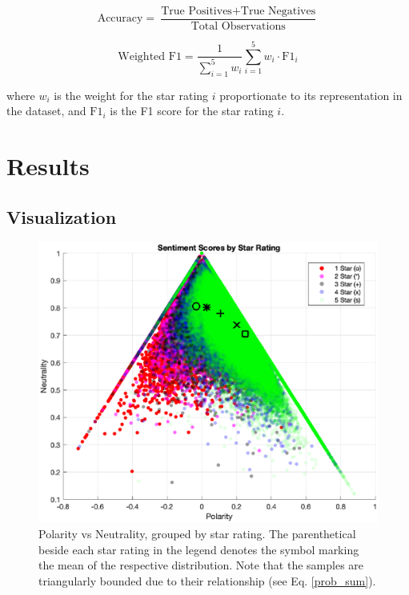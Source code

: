 \documentclass[sn-mathphys,Numbered]{sn-jnl}%
\theoremstyle{thmstyleone}%
\theoremstyle{thmstyletwo}%
\theoremstyle{thmstylethree}%
\begin{document}
\begin{equation}
\text{Accuracy} = \frac{\text{True Positives} + \text{True Negatives}}{\text{Total Observations}}
\end{equation}

\begin{equation} \label{eq:weighted_f1}
\text{Weighted F1} = \frac{1}{\sum_{i=1}^5 w_i} \sum_{i=1}^5 w_i \cdot \text{F1}_i
\end{equation}

where $w_i$ is the weight for the star rating $i$ proportionate to its representation in the dataset, and $\text{F1}_i$ is the F1 score for the star rating $i$.

\section{Results}\label{sec3}

\subsection{Visualization}
\begin{figure}[h!]
    \centering
    \includegraphics[width=\linewidth]{sent_scores_by_rating.eps}
    \caption{Polarity vs Neutrality, grouped by star rating. The parenthetical beside each star rating in the legend denotes the symbol marking the mean of the respective distribution. Note that the samples are triangularly bounded due to their relationship (see Eq. \ref{prob_sum}).}
    \label{fig:sent_plot}
\end{figure}
\end{document}
